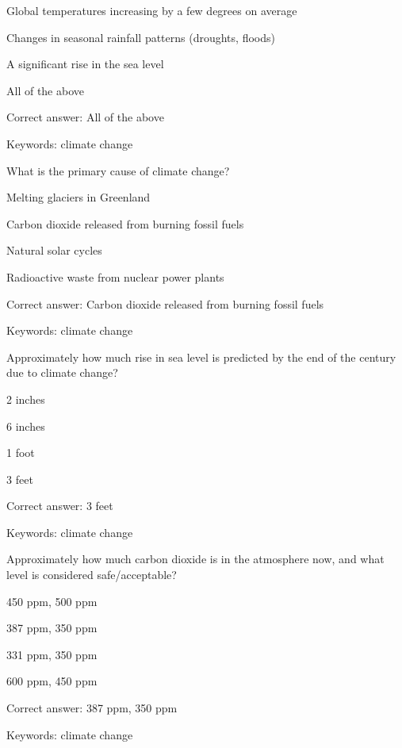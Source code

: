 \begin{answer}
	\item Global temperatures increasing by a few degrees on average
	\item Changes in seasonal rainfall patterns (droughts, floods)
	\item A significant rise in the sea level
	\item All of the above
\end{answer}

Correct answer: All of the above

Keywords: climate change

\begin{question}
	\item What is the primary cause of climate change?
\end{question}

\begin{answer}
	\item Melting glaciers in Greenland
	\item Carbon dioxide released from burning fossil fuels
	\item Natural solar cycles
	\item Radioactive waste from nuclear power plants
\end{answer}

Correct answer: Carbon dioxide released from burning fossil fuels

Keywords: climate change

\begin{question}
	\item Approximately how much rise in sea level is predicted by the end of the century due to climate change?
\end{question}

\begin{answer}
	\item 2 inches
	\item 6 inches
	\item 1 foot
	\item 3 feet
\end{answer}

Correct answer: 3 feet

Keywords: climate change

\begin{question}
	\item Approximately how much carbon dioxide is in the atmosphere now, and what level is considered safe/acceptable?
\end{question}

\begin{answer}
	\item 450 ppm, 500 ppm
	\item 387 ppm, 350 ppm
	\item 331 ppm, 350 ppm
	\item 600 ppm, 450 ppm
\end{answer}

Correct answer: 387 ppm, 350 ppm

Keywords: climate change

